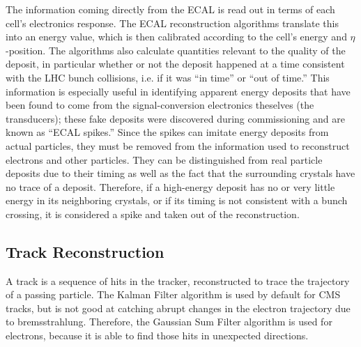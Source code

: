 The information coming directly from the ECAL 
is read out in terms of each cell's electronics response.  
The ECAL reconstruction algorithms translate this into 
an energy value, which is then calibrated 
according to the cell's energy %
and 
$\eta$-position.  
The algorithms also calculate quantities 
relevant to the quality of the deposit, 
in particular whether or not the deposit happened 
at a time consistent with the LHC 
bunch collisions, i.e. if it was ``in time'' or ``out of time.''  
This information is especially useful in 
identifying apparent energy deposits that have 
been found to come from the 
signal-conversion electronics theselves (the transducers); %
these fake deposits were discovered during 
commissioning and are known as ``ECAL spikes.''  
Since the spikes can imitate energy deposits from 
actual 
particles, %
they must be removed from the information used 
to reconstruct electrons and other particles.  
They can be distinguished from real particle deposits 
due to their timing 
as well as the fact that the surrounding crystals 
have no trace of a deposit.  
Therefore, if a high-energy deposit has no or 
very little energy in its neighboring crystals, 
or if its timing is not consistent with a bunch 
crossing, 
it is considered a spike and taken out of the 
reconstruction.  



\subsection{Track Reconstruction}
\label{evReco:track}
A track is a sequence of hits in the tracker, 
reconstructed to trace the trajectory of a passing 
particle.  
The Kalman Filter algorithm is used by default for CMS tracks, 
but is not good at catching abrupt changes in the 
electron trajectory due to bremsstrahlung.  
Therefore, the Gaussian Sum Filter algorithm 
is used for electrons, 
because it is able to find 
those hits in unexpected directions.  


